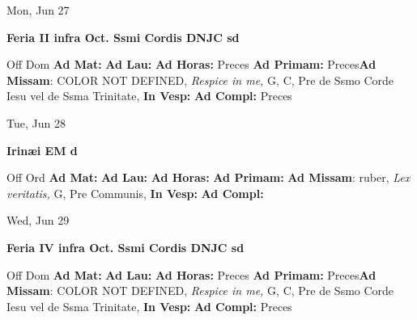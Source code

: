 \documentclass[10pt]{memoir}
\begin{document}
\begin{center}
\begin{minipage}{3.5in}
\vspace{2em}
\begin{center}Mon, Jun 27
\end{center}
\textbf{ \large Feria II infra Oct. Ssmi Cordis DNJC
\textnormal{\normalsize sd}}

\begin{justify}Off Dom
\textbf{Ad Mat: }
\textbf{Ad Lau: }
\textbf{Ad Horas: }Preces
\textbf{Ad Primam: }Preces\textbf{Ad Missam}: COLOR NOT DEFINED, \textit{Respice in me,} G, C, Pre de Ssmo Corde Iesu vel de Ssma Trinitate, 
\textbf{In Vesp: }
\textbf{Ad Compl: }Preces
\end{justify}
\end{minipage}
\end{center}

\begin{center}
\begin{minipage}{3.5in}
\vspace{2em}
\begin{center}Tue, Jun 28
\end{center}
\textbf{ \large Irinæi EM
\textnormal{\normalsize d}}

\begin{justify}Off Ord
\textbf{Ad Mat: }
\textbf{Ad Lau: }
\textbf{Ad Horas: }
\textbf{Ad Primam: }\textbf{Ad Missam}: ruber, \textit{Lex veritatis,} G, Pre Communis, 
\textbf{In Vesp: }
\textbf{Ad Compl: }
\end{justify}
\end{minipage}
\end{center}

\begin{center}
\begin{minipage}{3.5in}
\vspace{2em}
\begin{center}Wed, Jun 29
\end{center}
\textbf{ \large Feria IV infra Oct. Ssmi Cordis DNJC
\textnormal{\normalsize sd}}

\begin{justify}Off Dom
\textbf{Ad Mat: }
\textbf{Ad Lau: }
\textbf{Ad Horas: }Preces
\textbf{Ad Primam: }Preces\textbf{Ad Missam}: COLOR NOT DEFINED, \textit{Respice in me,} G, C, Pre de Ssmo Corde Iesu vel de Ssma Trinitate, 
\textbf{In Vesp: }
\textbf{Ad Compl: }Preces
\end{justify}
\end{minipage}
\end{center}
\end{document}
